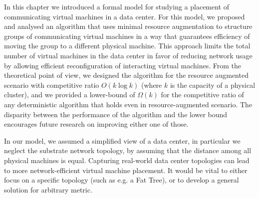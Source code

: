 In this chapter we introduced a formal model for studying a placement of communicating virtual machines in a data center.
For this model, we proposed and analysed an algorithm that uses minimal resource augmentation to structure groups of communicating virtual machines in a way that guarantees efficiency of moving the group to a different physical machine.
This approach limits the total number of virtual machines in the data center in favor of reducing network usage by allowing efficient reconfiguration of interacting virtual machines.
From the theoretical point of view, we designed the algorithm for the resource augmented scenario with competitive ratio $O(k\log k)$ (where $k$ is the capacity of a physical cluster), and we provided a lower-bound of $\Omega(k)$ for the competitive ratio of any deterministic algorithm that holds even in resource-augmented scenario.
The disparity between the performance of the algorithm and the lower bound encourages future research on improving either one of those.

In our model, we assumed a simplified view of a data center, in particular we neglect the substrate network topology, by assuming that the distance among all physical machines is equal.
Capturing real-world data center topologies can lead to more network-efficient virtual machine placement.
It would be vital to either focus on a specific topology (such as e.g. a Fat Tree), or to develop a general solution for arbitrary metric.
